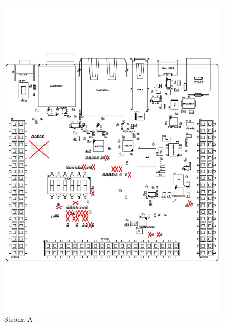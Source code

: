 \begin{figure}[!htb]
	\begin{minipage}{0.5\textwidth}
		\centering
		\includegraphics[width=0.9\linewidth,clip, trim=0cm 4cm 0cm 4cm]{./chapters/chapter5/liteboard_A.PDF}
		\caption{Strona A}\label{chilli:StronaA}
	\end{minipage}\hfill
	\begin{minipage}{0.5\textwidth}
		\centering

\end{minipage}
\end{figure}

